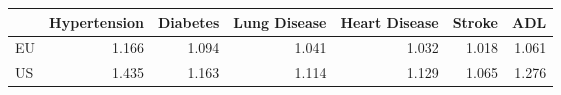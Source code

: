 \begin{tabular}{lrrrrrr}
\toprule
{} &  Hypertension &  Diabetes &  Lung Disease &  Heart Disease &  Stroke &    ADL \\
\midrule
EU &         1.166 &     1.094 &         1.041 &          1.032 &   1.018 &  1.061 \\
US &         1.435 &     1.163 &         1.114 &          1.129 &   1.065 &  1.276 \\
\bottomrule
\end{tabular}
